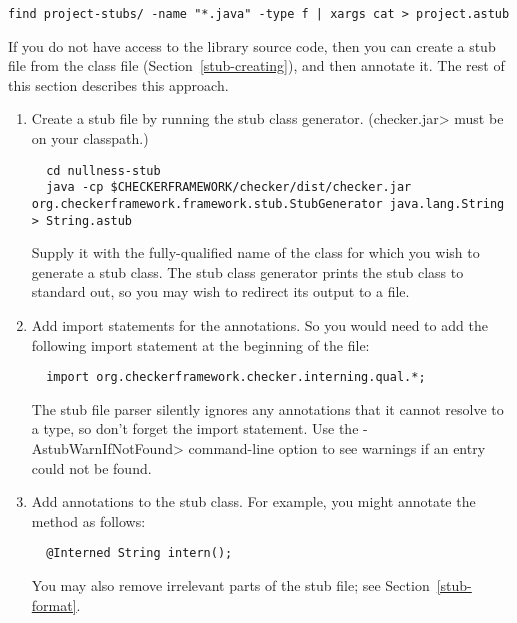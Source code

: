 \begin{Verbatim}
find project-stubs/ -name "*.java" -type f | xargs cat > project.astub
\end{Verbatim}




If you do not have access to the library source code, then you can create a
stub file from the class file (Section~\ref{stub-creating}),
and then annotate it.  The rest of this section describes this approach.


\begin{enumerate}

\item
  Create a stub file by running the stub class generator.  (\<checker.jar> must be on your classpath.)

\begin{Verbatim}
  cd nullness-stub
  java -cp $CHECKERFRAMEWORK/checker/dist/checker.jar org.checkerframework.framework.stub.StubGenerator java.lang.String > String.astub
\end{Verbatim}

  Supply it with the fully-qualified name of the class for which you wish to
  generate a stub class.  The stub class generator prints the
  stub class to standard out, so you may wish to redirect its output to a
  file.

\item
  Add import statements for the annotations.  So you would need to
add the following import statement at the beginning of the file:

\begin{Verbatim}
  import org.checkerframework.checker.interning.qual.*;
\end{Verbatim}

\noindent
The stub file parser silently ignores any annotations that it cannot
resolve to a type, so don't forget the import statement.
Use the \<-AstubWarnIfNotFound> command-line option to see warnings
if an entry could not be found.

\item
  Add annotations to the stub class.  For example, you might annotate
  the  method as follows:

\begin{Verbatim}
  @Interned String intern();
\end{Verbatim}

  You may also remove irrelevant parts of the stub file; see
  Section~\ref{stub-format}.

\end{enumerate}


